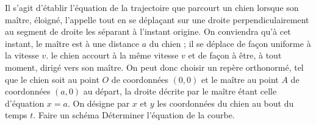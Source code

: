 \begin{Exercise}[title=La courbe du chien]
  Il s’agit d’établir l'équation de la trajectoire que parcourt un chien lorsque son maître, éloigné, l'appelle tout en se déplaçant sur une droite perpendiculairement au segment de droite les séparant à l’instant origine. On conviendra qu'à cet instant, le maître est à une distance $a$ du chien ; il se déplace de façon uniforme à la vitesse $v$. le chien accourt à la même vitesse $v$ et de façon à être, à tout moment, dirigé vers son maître. On peut donc choisir un repère orthonormé, tel que le chien soit au point $ O$ de coordonnées $(0,0)$ et le maître au point $A$ de coordonnées $(a,0)$ au départ, la droite décrite par le maître étant celle d’équation $x = a$. On désigne par $x$ et $y$ les coordonnées du chien au bout du temps $t$.
  \Question Faire un schéma
  \Question Déterminer l'équation de la courbe.
\end{Exercise}
